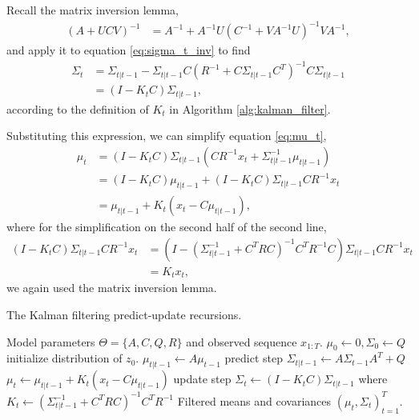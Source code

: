 \documentclass[14pt]{extreport}
\begin{document}
Recall the matrix inversion lemma,
\begin{align*}
\left(A + UCV\right)^{-1} &= A^{-1} + A^{-1}U\left(C^{-1} + VA^{-1}U\right)^{-1}VA^{-1},
\end{align*}
and apply it to equation \ref{eq:sigma_t_inv} to find
\begin{align*}
  \Sigma_{t} &= \Sigma_{t \vert t - 1} - \Sigma_{t \vert t - 1}C\left(R^{-1} + C \Sigma_{t \vert t - 1}C^{T}\right)^{-1}C\Sigma_{t \vert t - 1} \\
  &= \left(I - K_{t}C\right)\Sigma_{t \vert t - 1},
\end{align*}
according to the definition of $K_{t}$ in Algorithm
\ref{alg:kalman_filter}.

Substituting this expression, we can simplify equation \ref{eq:mu_t},
\begin{align*}
  \mu_{t} &= \left(I - K_{t} C\right)\Sigma_{t \vert t - 1}\left(C R^{-1}x_{t} + \Sigma_{t \vert t - 1}^{-1} \mu_{t \vert t - 1}\right) \\
  &= \left(I - K_{t}C\right)\mu_{t \vert t - 1} + \left(I - K_{t} C\right)\Sigma_{t \vert t - 1}C R^{-1} x_{t} \\
  &= \mu_{t \vert t - 1} + K_{t}\left(x_{t} - C\mu_{t \vert t- 1}\right),
\end{align*}
where for the simplification on the second half of the second line,
\begin{align*}
  \left(I - K_{t}C\right)\Sigma_{t \vert t - 1} C R^{-1} x_{t} &= \left(I - \left(\Sigma_{t \vert t - 1}^{-1} + C^{T} R C\right)^{-1}C^{T}R^{-1}C\right)\Sigma_{t \vert t - 1}C R^{-1} x_{t} \\
  &= K_{t}x_{t},
\end{align*}
we again used the matrix inversion lemma.

\begin{algorithm}
   \caption{The Kalman filtering predict-update recursions.}
   \label{alg:kalman_filter}
\begin{algorithmic}
   Model parameters $\Theta = \{A, C, Q, R\}$ and
    observed sequence $x_{1:T}$.
    \STATE $\mu_{0} \leftarrow 0, \Sigma_{0} \leftarrow Q$ \hfill initialize distribution of
    $z_{0}$.
    \STATE $\mu_{t \vert t - 1} \leftarrow A\mu_{t - 1}$ \hfill predict step
    \STATE $\Sigma_{t \vert t - 1} \leftarrow A \Sigma_{t - 1} A^{T} + Q$
    \STATE $\mu_{t} \leftarrow \mu_{t \vert t - 1} + K_{t}\left(x_{t} - C\mu_{t \vert t - 1}\right)$ \hfill update step
    \STATE $\Sigma_{t} \leftarrow \left(I - K_{t}C\right)\Sigma_{t \vert t - 1}$
    \STATE where $K_{t} \leftarrow \left(\Sigma_{t \vert t - 1}^{-1} + C^{T}R C\right)^{-1} C^{T}R^{-1}$
    \ENDFOR
     Filtered means and covariances $\left(\mu_{t},
    \Sigma_{t}\right)_{t = 1}^{T}$.
\end{algorithmic}
\end{algorithm}
\end{document}
